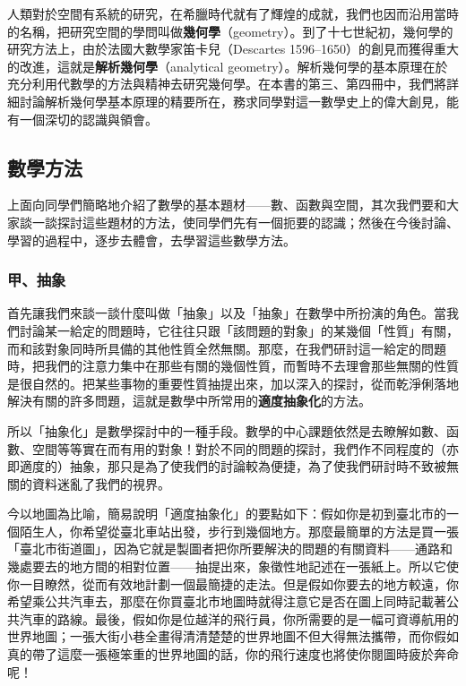 人類對於空間有系統的研究，在希臘時代就有了輝煌的成就，我們也因而沿用當時的名稱，把研究空間的學問叫做\textbf{幾何學}（geometry）。到了十七世紀初，幾何學的研究方法上，由於法國大數學家笛卡兒（Descartes 1596--1650）的創見而獲得重大的改進，這就是\textbf{解析幾何學}（analytical geometry）。解析幾何學的基本原理在於充分利用代數學的方法與精神去研究幾何學。在本書的第三、第四冊中，我們將詳細討論解析幾何學基本原理的精要所在，務求同學對這一數學史上的偉大創見，能有一個深切的認識與領會。

\subsection{數學方法}\label{sec:1-2}

上面向同學們簡略地介紹了數學的基本題材——數、函數與空間，其次我們要和大家談一談探討這些題材的方法，使同學們先有一個扼要的認識；然後在今後討論、學習的過程中，逐步去體會，去學習這些數學方法。

\subsubsection*{甲、抽象}\label{subsec:abstraction}

首先讓我們來談一談什麼叫做「抽象」以及「抽象」在數學中所扮演的角色。當我們討論某一給定的問題時，它往往只跟「該問題的對象」的某幾個「性質」有關，而和該對象同時所具備的其他性質全然無關。那麼，在我們研討這一給定的問題時，把我們的注意力集中在那些有關的幾個性質，而暫時不去理會那些無關的性質是很自然的。把某些事物的重要性質抽提出來，加以深入的探討，從而乾淨俐落地解決有關的許多問題，這就是數學中所常用的\textbf{適度抽象化}的方法。

所以「抽象化」是數學探討中的一種手段。數學的中心課題依然是去瞭解如數、函數、空間等等實在而有用的對象！對於不同的問題的探討，我們作不同程度的（亦即適度的）抽象，那只是為了使我們的討論較為便捷，為了使我們研討時不致被無關的資料迷亂了我們的視界。

今以地圖為比喻，簡易說明「適度抽象化」的要點如下：假如你是初到臺北市的一個陌生人，你希望從臺北車站出發，步行到幾個地方。那麼最簡單的方法是買一張「臺北市街道圖」，因為它就是製圖者把你所要解決的問題的有關資料——通路和幾處要去的地方間的相對位置——抽提出來，象徵性地記述在一張紙上。所以它使你一目瞭然，從而有效地計劃一個最簡捷的走法。但是假如你要去的地方較遠，你希望乘公共汽車去，那麼在你買臺北市地圖時就得注意它是否在圖上同時記載著公共汽車的路線。最後，假如你是位越洋的飛行員，你所需要的是一幅可資導航用的世界地圖；一張大街小巷全畫得清清楚楚的世界地圖不但大得無法攜帶，而你假如真的帶了這麼一張極笨重的世界地圖的話，你的飛行速度也將使你閱圖時疲於奔命呢！

